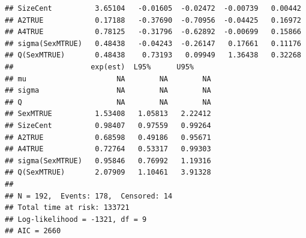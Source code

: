 \documentclass{article}\usepackage[]{graphicx}\usepackage[]{color}
\makeatletter
\newenvironment{kframe}{%
 \def\at@end@of@kframe{}%
 \ifinner\ifhmode%
  \def\at@end@of@kframe{\end{minipage}}%
  \begin{minipage}{\columnwidth}%
 \fi\fi%
 \def\FrameCommand##1{\hskip\@totalleftmargin \hskip-\fboxsep
 \colorbox{shadecolor}{##1}\hskip-\fboxsep
     \hskip-\linewidth \hskip-\@totalleftmargin \hskip\columnwidth}%
 \MakeFramed {\advance\hsize-\width
   \@totalleftmargin\z@ \linewidth\hsize
   \@setminipage}}%
 {\par\unskip\endMakeFramed%
 \at@end@of@kframe}
\newenvironment{knitrout}{}{} %
\makeatother
\begin{document}
\begin{knitrout}
\begin{kframe}
\begin{verbatim}
## SizeCent          3.65104   -0.01605  -0.02472  -0.00739   0.00442
## A2TRUE            0.17188   -0.37690  -0.70956  -0.04425   0.16972
## A4TRUE            0.78125   -0.31796  -0.62892  -0.00699   0.15866
## sigma(SexMTRUE)   0.48438   -0.04243  -0.26147   0.17661   0.11176
## Q(SexMTRUE)       0.48438    0.73193   0.09949   1.36438   0.32268
##                  exp(est)  L95%      U95%    
## mu                     NA        NA        NA
## sigma                  NA        NA        NA
## Q                      NA        NA        NA
## SexMTRUE          1.53408   1.05813   2.22412
## SizeCent          0.98407   0.97559   0.99264
## A2TRUE            0.68598   0.49186   0.95671
## A4TRUE            0.72764   0.53317   0.99303
## sigma(SexMTRUE)   0.95846   0.76992   1.19316
## Q(SexMTRUE)       2.07909   1.10461   3.91328
## 
## N = 192,  Events: 178,  Censored: 14
## Total time at risk: 133721
## Log-likelihood = -1321, df = 9
## AIC = 2660
\end{verbatim}
\end{kframe}
\end{knitrout}
\end{document}
